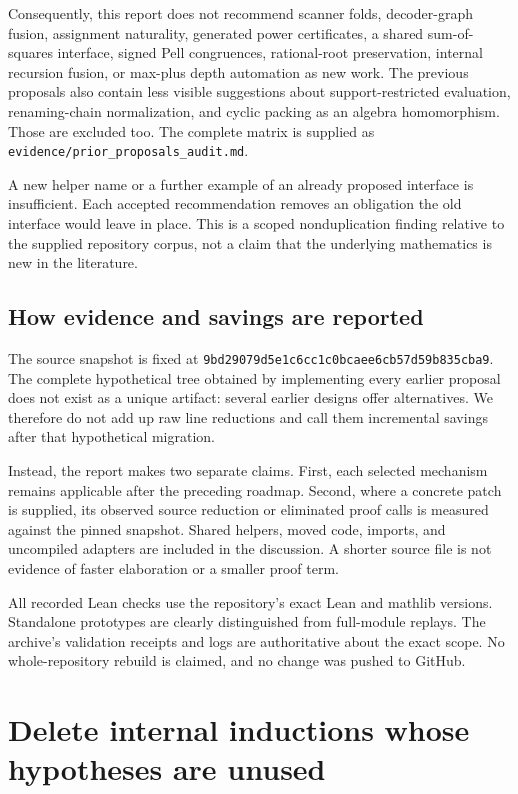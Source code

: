 \documentclass[11pt,letterpaper]{article}
\newcommand{\code}[1]{\nolinkurl{#1}}
\begin{document}
Consequently, this report does not recommend scanner folds, decoder-graph fusion, assignment naturality, generated power certificates, a shared sum-of-squares interface, signed Pell congruences, rational-root preservation, internal recursion fusion, or max-plus depth automation as new work. The previous proposals also contain less visible suggestions about support-restricted evaluation, renaming-chain normalization, and cyclic packing as an algebra homomorphism. Those are excluded too. The complete matrix is supplied as \code{evidence/prior_proposals_audit.md}.

A new helper name or a further example of an already proposed interface is insufficient. Each accepted recommendation removes an obligation the old interface would leave in place. This is a scoped nonduplication finding relative to the supplied repository corpus, not a claim that the underlying mathematics is new in the literature.

\subsection{How evidence and savings are reported}

The source snapshot is fixed at \texttt{9bd29079d5e1c6cc1c0bcaee6cb57d59b835cba9}. The complete hypothetical tree obtained by implementing every earlier proposal does not exist as a unique artifact: several earlier designs offer alternatives. We therefore do not add up raw line reductions and call them incremental savings after that hypothetical migration.

Instead, the report makes two separate claims. First, each selected mechanism remains applicable after the preceding roadmap. Second, where a concrete patch is supplied, its observed source reduction or eliminated proof calls is measured against the pinned snapshot. Shared helpers, moved code, imports, and uncompiled adapters are included in the discussion. A shorter source file is not evidence of faster elaboration or a smaller proof term.

All recorded Lean checks use the repository's exact Lean and mathlib versions. Standalone prototypes are clearly distinguished from full-module replays. The archive's validation receipts and logs are authoritative about the exact scope. No whole-repository rebuild is claimed, and no change was pushed to GitHub.

\section{Delete internal inductions whose hypotheses are unused}
\label{sec:cases}
\end{document}
